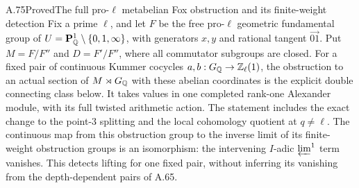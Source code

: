 \begin{statement}{A.75}{Proved}{The full pro-\(\ell\) metabelian Fox obstruction and its finite-weight detection}
Fix a prime $\ell$, and let $F$ be the free pro-$\ell$ geometric
fundamental group of $U=\mathbf P^1_\mathbb Q\setminus\{0,1,\infty\}$,
with generators $x,y$ and rational tangent $\overrightarrow{01}$.
Put $M=F/F''$ and $D=F'/F''$, where all commutator subgroups
are closed.
For a fixed pair of continuous Kummer cocycles
$a,b:G_\mathbb Q\to\mathbb Z_\ell(1)$, the obstruction to an actual section of
$M\rtimes G_\mathbb Q$ with these abelian coordinates is the explicit
double connecting class below.
It takes values in one completed rank-one Alexander module,
with its full twisted arithmetic action.
The statement includes the exact change to the point-$3$
splitting and the local cohomology quotient at $q\ne\ell$.
The continuous map from this obstruction group to the
inverse limit of its finite-weight obstruction groups is
an isomorphism: the intervening $I$-adic $\varprojlim^1$
term vanishes.  This detects lifting for one fixed pair,
without inferring its vanishing from the depth-dependent
pairs of A.65.
\end{statement}
